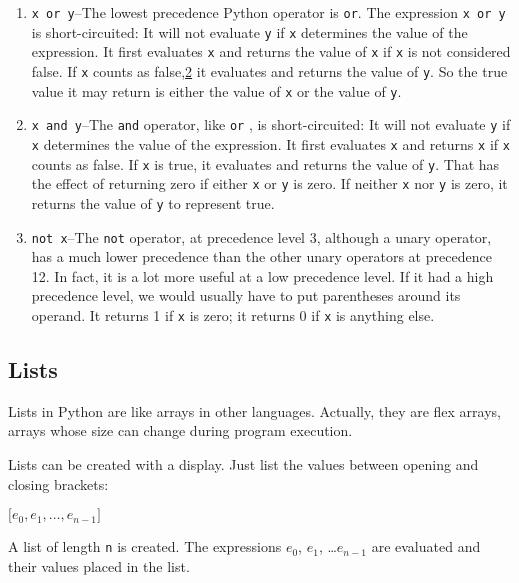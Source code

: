 \begin{enumerate}
\item
  
  \verb"x or y"--The lowest precedence Python operator is \texttt{or}. The expression
  \texttt{x or y} is short-circuited: It will not evaluate \texttt{y} if
  \texttt{x} determines the value of the expression. It first evaluates
  \texttt{x} and returns the value of \texttt{x} if \texttt{x} is not
  considered false. If \texttt{x} counts as
  false,\protect\hyperlink{pgfId-123468}{2} it evaluates and returns the
  value of \texttt{y}. So the true value it may return is either the
  value of \texttt{x} or the value of \texttt{y}.
\item
  
  \verb"x and y"--The \texttt{and} operator, like \texttt{or} , is short-circuited: It
  will not evaluate \texttt{y} if \texttt{x} determines the value of the
  expression. It first evaluates \texttt{x} and returns \texttt{x} if
  \texttt{x} counts as false. If \texttt{x} is true, it evaluates and
  returns the value of \texttt{y}. That has the effect of returning zero
  if either \texttt{x} or \texttt{y} is zero. If neither \texttt{x} nor
  \texttt{y} is zero, it returns the value of \texttt{y} to represent true.
\item
  \verb"not x"--The
  \texttt{not} operator, at precedence level 3, although a unary operator,
  has a much lower precedence than the other unary operators at
  precedence 12. In fact, it is a lot more useful at a low precedence
  level. If it had a high precedence level, we would usually have to put
  parentheses around its operand. It returns 1 if \texttt{x} is zero; it
  returns 0 if \texttt{x} is anything else.
\end{enumerate}

\subsection{Lists}

Lists in Python are like arrays in
other languages. Actually, they are flex arrays, arrays whose size can
change during program execution.

Lists can be created with a
display. Just list the values between opening and closing brackets:

$\lbrack e_0, e_1, \ldots, e_{n-1} \rbrack$

A list of length \texttt{n} is
created. The expressions $e_0$, $e_1$, \ldots $e_{n-1}$ are evaluated
and their values placed in the list.

